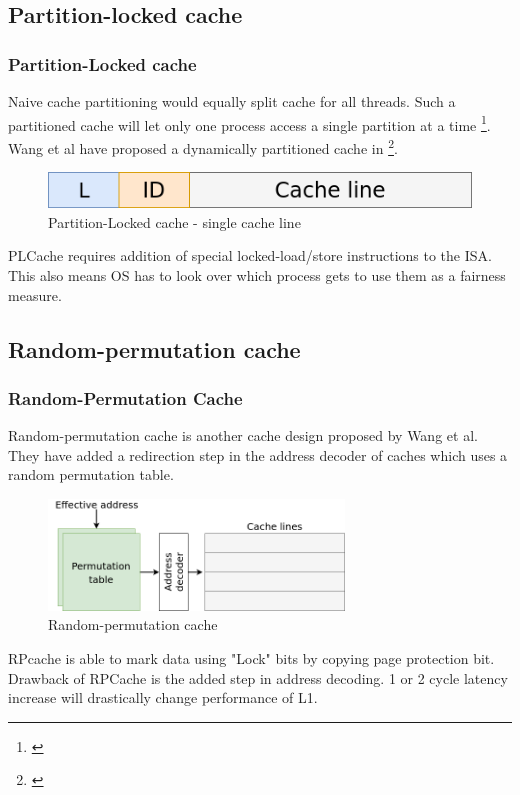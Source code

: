 \documentclass[10pt]{beamer}
\begin{document}
\subsection{Partition-locked cache}

\begin{frame}
\frametitle{Partition-Locked cache}
Naive cache partitioning would equally split cache for all threads.
    Such a partitioned cache will let only one process access a single partition at a time \footnote{\cite{part_cache}}.
    Wang et al have proposed a dynamically partitioned cache in \footnote{\cite{wang}}.
\begin{figure}[h]
\centering
\includegraphics[width=\textwidth]{pl-cache}
\caption{Partition-Locked cache - single cache line}
\end{figure}
PLCache requires addition of special locked-load/store instructions to the ISA.
This also means OS has to look over
which process gets to use them as a fairness measure.
\end{frame}

\subsection{Random-permutation cache}

\begin{frame}
\frametitle{Random-Permutation Cache}
Random-permutation cache is another cache design proposed by Wang et al. They
have added a redirection step in the address decoder of caches which uses a random permutation table.
\begin{figure}[h]
\centering
\includegraphics[width=0.7\textwidth]{rp-cache}
\caption{Random-permutation cache}
\end{figure}
RPcache is able to mark data using "Lock" bits by copying page protection bit.
Drawback of RPCache is the added step in address decoding.
1 or 2 cycle latency increase will drastically change performance of L1.
\end{frame}
\end{document}
